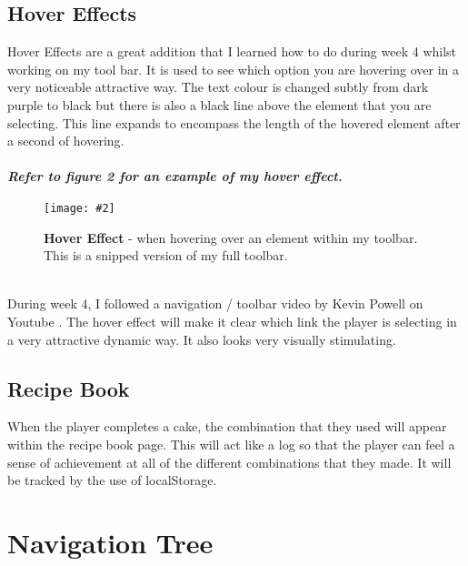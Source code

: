 \documentclass[10pt, a4paper]{article}
\newcommand{\figuremacro}[5]{
    \begin{figure}[#1]
        \centering
        \texttt{[image: \#2]}
        \caption[#3]{\textbf{#3}#4}
        \label{fig:#2}
    \end{figure}
}
\begin{document}
    \subsection{Hover Effects}
    Hover Effects are a great addition that I learned how to do during week 4 whilst working on my tool bar. It is used to see which option you are hovering over in a very noticeable attractive way. The text colour is changed subtly from dark purple to black but there is also a black line above the element that you are selecting. This line expands to encompass the length of the hovered element after a second of hovering. \\
    \\
    \textbf{\textit{Refer to figure 2 for an example of my hover effect.}} \\ 
    \figuremacro{h}{hover}{Hover Effect}{ - when hovering over an element within my toolbar. This is a snipped version of my full toolbar.}{1.0} \\
    During week 4, I followed a navigation / toolbar video by Kevin Powell on Youtube \cite{Navbar}. The hover effect will make it clear which link the player is selecting in a very attractive dynamic way. It also looks very visually stimulating. 
   
    \subsection{Recipe Book}
    When the player completes a cake, the combination that they used will appear within the recipe book page. This will act like a log so that the player can feel a sense of achievement at all of the different combinations that they made. It will be tracked by the use of localStorage. 
    
    \section{Navigation Tree}
    
\end{document}
